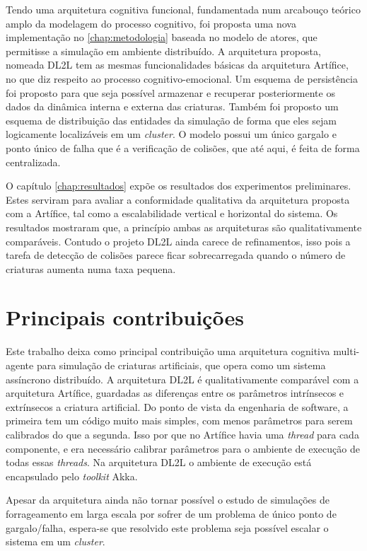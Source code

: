 Tendo uma arquitetura cognitiva funcional, fundamentada num arcabouço teórico amplo da modelagem do processo cognitivo, foi proposta uma nova implementação no \autoref{chap:metodologia} baseada no modelo de atores, que permitisse a simulação em ambiente distribuído. A arquitetura proposta, nomeada DL2L tem as mesmas funcionalidades básicas da arquitetura Artífice, no que diz respeito ao processo cognitivo-emocional. Um esquema de persistência foi proposto para que seja possível armazenar e recuperar posteriormente os dados da dinâmica interna e externa das criaturas. Também foi proposto um esquema de distribuição das entidades da simulação de forma que eles sejam logicamente localizáveis em um \textit{cluster}. O modelo possui um único gargalo e ponto único de falha que é a verificação de colisões, que até aqui, é feita de forma centralizada.

O capítulo \autoref{chap:resultados} expõe os resultados dos experimentos preliminares. Estes serviram para avaliar a conformidade qualitativa da arquitetura proposta com a Artífice, tal como a escalabilidade vertical e horizontal do sistema. Os resultados mostraram que, a princípio ambas as arquiteturas são qualitativamente comparáveis. Contudo o projeto DL2L ainda carece de refinamentos, isso pois a tarefa de detecção de colisões parece ficar sobrecarregada quando o número de criaturas aumenta numa taxa pequena. 

\section{Principais contribuições}


Este trabalho deixa como principal contribuição uma arquitetura cognitiva multi-agente para simulação de criaturas artificiais, que opera como um sistema assíncrono distribuído. A arquitetura DL2L é qualitativamente comparável com a arquitetura Artífice, guardadas as diferenças entre os parâmetros intrínsecos e extrínsecos a criatura artificial. Do ponto de vista da engenharia de software, a primeira tem um código muito mais simples, com menos parâmetros para serem calibrados do que a segunda. Isso por que no Artífice havia uma \textit{thread} para cada componente, e era necessário calibrar parâmetros para o ambiente de execução de todas essas \textit{threads}. Na arquitetura DL2L o ambiente de execução está encapsulado pelo \textit{toolkit} Akka. 

Apesar da arquitetura ainda não tornar possível o estudo de simulações de forrageamento em larga escala por sofrer de um problema de único ponto de gargalo/falha, espera-se que resolvido este problema seja possível escalar o sistema em um \textit{cluster}. 


